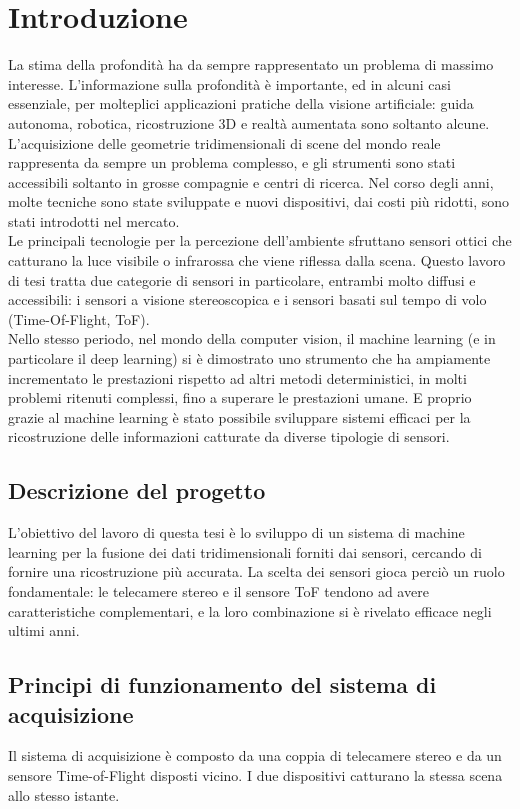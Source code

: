 \chapter{Introduzione}  
La stima della profondità ha da sempre rappresentato un problema di massimo interesse. L'informazione sulla profondità è importante, ed in alcuni casi essenziale, per molteplici applicazioni pratiche della visione artificiale: guida autonoma, robotica, ricostruzione 3D e realtà aumentata sono soltanto alcune. \\
L'acquisizione delle geometrie tridimensionali di scene del mondo reale rappresenta da sempre un problema complesso, e gli strumenti sono stati accessibili soltanto in grosse compagnie e centri di ricerca. Nel corso degli anni, molte tecniche sono state sviluppate e nuovi dispositivi, dai costi più ridotti, sono stati introdotti nel mercato.\\
Le principali tecnologie per la percezione dell'ambiente sfruttano sensori ottici che catturano la luce visibile o infrarossa che viene riflessa dalla scena. Questo lavoro di tesi tratta due categorie di sensori in particolare, entrambi molto diffusi e accessibili: i sensori a visione stereoscopica e i sensori basati sul tempo di volo (Time-Of-Flight, ToF).\\
Nello stesso periodo, nel mondo della computer vision, il machine learning (e in particolare il deep learning) si è dimostrato uno strumento che ha ampiamente incrementato le prestazioni rispetto ad altri metodi deterministici, in molti problemi ritenuti complessi, fino a superare le prestazioni umane. E proprio grazie al machine learning è stato possibile sviluppare sistemi efficaci per la ricostruzione delle informazioni catturate da diverse tipologie di sensori.

\section{Descrizione del progetto}
L'obiettivo del lavoro di questa tesi è lo sviluppo di un sistema di machine learning per la fusione dei dati tridimensionali forniti dai sensori, cercando di fornire una ricostruzione più accurata. La scelta dei sensori gioca perciò un ruolo fondamentale: le telecamere stereo e il sensore ToF tendono ad avere caratteristiche complementari, e la loro combinazione si è rivelato efficace negli ultimi anni. 

\section{Principi di funzionamento del sistema di acquisizione}
Il sistema di acquisizione è composto da una coppia di telecamere stereo e da un sensore Time-of-Flight disposti vicino. I due dispositivi catturano la stessa scena allo stesso istante.

